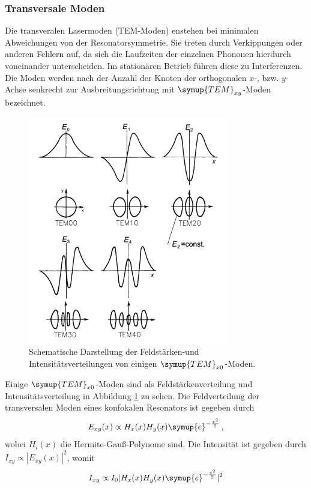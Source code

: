 \subsubsection{Transversale Moden}
Die transveralen Lasermoden (TEM-Moden) enstehen bei minimalen Abweichungen von der Resonatorsymmetrie.
Sie treten durch Verkippungen oder anderen Fehlern auf, da sich die Laufzeiten
der einzelnen Phononen hierdurch voneinander unterscheiden. Im stationären Betrieb
führen diese zu Interferenzen. Die Moden werden nach der Anzahl der Knoten der orthogonalen $x$-, bzw. $y$-Achse senkrecht
zur Ausbreitungsrichtung mit $\symup{TEM}_{xy}$-Moden bezeichnet. 
\begin{figure}
    \centering
    \includegraphics[width = 0.78\textwidth]{pics/Temx.png}
    \caption{Schematische Darstellung der Feldstärken-und Intensitätsverteilungen von einigen $\symup{TEM}_{x0}$-Moden.\cite{Laser}}
    \label{pic:Tem}
\end{figure}
Einige $\symup{TEM}_{x0}$-Moden sind als Feldstärkenverteilung und Intensitätsverteilung in Abbildung \ref{pic:Tem} zu sehen.
Die Feldverteilung der transversalen Moden eines konfokalen Resonators ist gegeben durch
\begin{equation}
    E_{xy}(x) \propto H_x(x) H_y(x) \symup{e}^{-\frac{x^2}{2}} \, \text{,}
\end{equation}
wobei $H_i(x)$ die Hermite-Gauß-Polynome sind. Die Intensität ist gegeben durch $I_{xy} \propto |E_{xy}(x)|^2$,
womit
\begin{equation}
    I_{xy} \propto I_0 |H_x(x) H_y(x) \symup{e}^{-\frac{x^2}{2}}|^2 
\end{equation}
